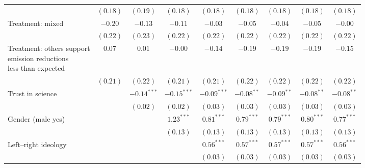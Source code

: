 \begin{table}[h]
\begin{center}
\begin{tabular}{l c c c c c c c c}
                                                                                & $(0.18)$     & $(0.19)$      & $(0.18)$      & $(0.18)$      & $(0.18)$      & $(0.18)$      & $(0.18)$      & $(0.18)$      \\
Treatment: mixed                                                                & $-0.20$      & $-0.13$       & $-0.11$       & $-0.03$       & $-0.05$       & $-0.04$       & $-0.05$       & $-0.00$       \\
                                                                                & $(0.22)$     & $(0.23)$      & $(0.22)$      & $(0.22)$      & $(0.22)$      & $(0.22)$      & $(0.22)$      & $(0.22)$      \\
\shortstack{Treatment: others support\\emission reductions\\less than expected} & $0.07$       & $0.01$        & $-0.00$       & $-0.14$       & $-0.19$       & $-0.19$       & $-0.19$       & $-0.15$       \\
                                                                                & $(0.21)$     & $(0.22)$      & $(0.21)$      & $(0.21)$      & $(0.22)$      & $(0.22)$      & $(0.22)$      & $(0.22)$      \\
Trust in science                                                                &              & $-0.14^{***}$ & $-0.15^{***}$ & $-0.09^{***}$ & $-0.08^{**}$  & $-0.09^{**}$  & $-0.08^{**}$  & $-0.08^{**}$  \\
                                                                                &              & $(0.02)$      & $(0.02)$      & $(0.03)$      & $(0.03)$      & $(0.03)$      & $(0.03)$      & $(0.03)$      \\
Gender (male yes)                                                               &              &               & $1.23^{***}$  & $0.81^{***}$  & $0.79^{***}$  & $0.79^{***}$  & $0.80^{***}$  & $0.77^{***}$  \\
                                                                                &              &               & $(0.13)$      & $(0.13)$      & $(0.13)$      & $(0.13)$      & $(0.13)$      & $(0.13)$      \\
Left–right ideology                                                             &              &               &               & $0.56^{***}$  & $0.57^{***}$  & $0.57^{***}$  & $0.57^{***}$  & $0.56^{***}$  \\
                                                                                &              &               &               & $(0.03)$      & $(0.03)$      & $(0.03)$      & $(0.03)$      & $(0.03)$      \\

\end{tabular}
\end{center}
\end{table}
